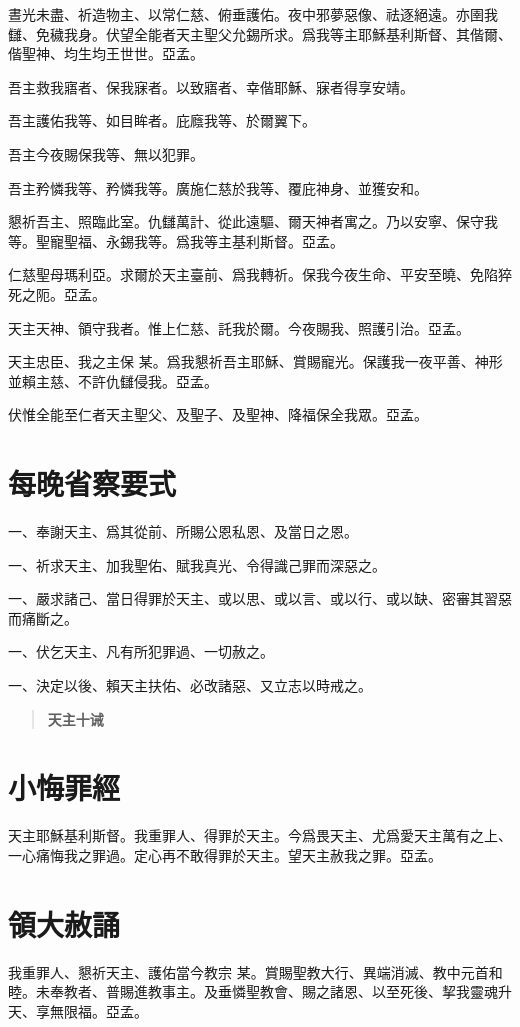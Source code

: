 晝光未盡、祈造物主、以常仁慈、俯垂護佑。夜中邪夢惡像、祛逐絕遠。亦圉我讎、免穢我身。伏望全能者天主聖父允錫所求。爲我等主耶穌基利斯督、其偕爾、偕聖神、均生均王世世。{\cspace}亞孟。

吾主救我寤者、保我寐者。以致寤者、幸偕耶穌、寐者得享安靖。

吾主護佑我等、如目眸者。庇廕我等、於爾翼下。

吾主今夜賜保我等、無以犯罪。

吾主矜憐我等、矜憐我等。廣施仁慈於我等、覆庇神身、並獲安和。

懇祈吾主、照臨此室。仇讎萬計、從此遠驅、爾天神者寓之。乃以安寧、保守我等。聖寵聖福、永錫我等。爲我等主基利斯督。{\cspace}亞孟。

仁慈聖母瑪利亞。求爾於天主臺前、爲我轉祈。保我今夜生命、平安至曉、免陷猝死之阨。{\cspace}亞孟。


天主天神、領守我者。惟上仁慈、託我於爾。今夜賜我、照護引治。{\cspace}亞孟。

天主忠臣、我之主保 {\small 某}。爲我懇祈吾主耶穌、賞賜寵光。保護我一夜平善、神形並賴主慈、不許仇讎侵我。{\cspace}亞孟。

伏惟全能至仁者天主聖父、及聖子、及聖神、降福保全我眾。{\cspace}亞孟。

\section*{每晚省察要式}
一、奉謝天主、爲其從前、所賜公恩私恩、及當日之恩。

一、祈求天主、加我聖佑、賦我真光、令得識己罪而深惡之。

一、嚴求諸己、當日得罪於天主、或以思、或以言、或以行、或以缺、密審其習惡而痛斷之。

一、伏乞天主、凡有所犯罪過、一切赦之。

一、決定以後、賴天主扶佑、必改諸惡、又立志以時戒之。

\begin{quote}
    \bfseries 天主十诫
\end{quote}

\section*{小悔罪經}
天主耶穌基利斯督。我重罪人、得罪於天主。今爲畏天主、尤爲愛天主萬有之上、一心痛悔我之罪過。定心再不敢得罪於天主。望天主赦我之罪。{\cspace}亞孟。

\section*{領大赦誦}
我重罪人、懇祈天主、護佑當今教宗 {\small 某}。賞賜聖教大行、異端消滅、教中元首和睦。未奉教者、普賜進教事主。及垂憐聖教會、賜之諸恩、以至死後、挈我靈魂升天、享無限福。{\cspace}亞孟。

